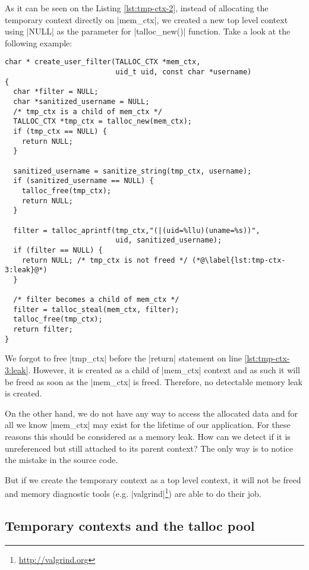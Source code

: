 As it can be seen on the Listing \ref{lst:tmp-ctx-2}, instead of allocating the
temporary context directly on |mem_ctx|, we created a new top level context
using |NULL| as the parameter for |talloc_new()| function. Take a look at the
following example:

\begin{lstlisting}[caption={Temporary context \#3},label=lst:tmp-ctx-3]
char * create_user_filter(TALLOC_CTX *mem_ctx,
                          uid_t uid, const char *username)
{
  char *filter = NULL;
  char *sanitized_username = NULL;
  /* tmp_ctx is a child of mem_ctx */
  TALLOC_CTX *tmp_ctx = talloc_new(mem_ctx);
  if (tmp_ctx == NULL) {
    return NULL;
  }
  
  sanitized_username = sanitize_string(tmp_ctx, username);
  if (sanitized_username == NULL) {
    talloc_free(tmp_ctx);
    return NULL;
  }
  
  filter = talloc_aprintf(tmp_ctx,"(|(uid=%llu)(uname=%s))",
                          uid, sanitized_username);
  if (filter == NULL) {
    return NULL; /* tmp_ctx is not freed */ (*@\label{lst:tmp-ctx-3:leak}@*)
  }
  
  /* filter becomes a child of mem_ctx */
  filter = talloc_steal(mem_ctx, filter);
  talloc_free(tmp_ctx);
  return filter;
}
\end{lstlisting}

\noindent
We forgot to free |tmp_ctx| before the |return| statement on line
\ref{lst:tmp-ctx-3:leak}. However, it is created as a child of |mem_ctx| context
and as such it will be freed as soon as the |mem_ctx| is freed. Therefore, no
detectable memory leak is created.

On the other hand, we do not have any way to access the allocated data
and for all we know |mem_ctx| may exist for the lifetime of our application.
For these reasons this should be considered as a memory leak. How can we detect
if it is unreferenced but still attached to its parent context? The only way
is to notice the mistake in the source code.

But if we create the temporary context as a top level context, it will not be
freed and memory diagnostic tools
(e.g. |valgrind|\footnote{\url{http://valgrind.org}}) are able to do their job.

\subsection{Temporary contexts and the talloc pool}
\label{talloc:subsec:tmp-ctx-and-pool}

